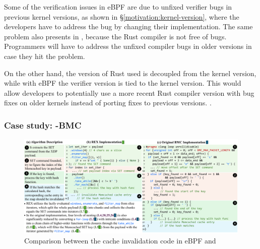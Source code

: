 
Some of the verification issues in eBPF are due to unfixed verifier bugs in
    previous kernel versions, as shown in \S\ref{motivation:kernel-version},
    where the developers have to address the bug by changing their
    implementation.
The same problem also presents in \projname{}, because the Rust compiler is not
    free of bugs.
Programmers will have to address the unfixed compiler bugs in older versions
    in case they hit the problem.

On the other hand, the version of Rust used is decoupled from the kernel version, while
    with eBPF the verifier version is tied to the kernel version.
This would allow developers to potentially use a more recent Rust compiler version with
    bug fixes on older kernels instead of porting fixes to previous versions.
.


\subsubsection{Case study: \projname{}-BMC}
\label{eval:bmc-case-study}

\begin{figure}[t]
    \includegraphics[width=1.0\linewidth]{figs/rusty-bmc.pdf}
    \centering
    \vspace{-10pt}
    \caption{Comparison between the cache invalidation code in eBPF
        and \projname{}}
    \vspace{-10pt}
    \label{fig:rust-code}
\end{figure}

